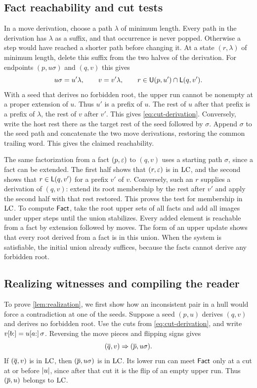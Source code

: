 \subsection{Fact reachability and cut tests}

In a move derivation, choose a path $\lambda$ of minimum length.
Every path in the derivation has $\lambda$ as a suffix, and that
occurrence is never popped. Otherwise a step would have reached a
shorter path before changing it. At a state $(r,\lambda)$ of minimum
length, delete this suffix from the two halves of the derivation.
For endpoints $(p,u\sigma)$ and $(q,v)$ this gives
\[
 u\sigma=u'\lambda,\qquad v=v'\lambda,\qquad
 r\in\mathsf U(p,u')\cap\mathsf L(q,v').
\]
With a seed that derives no forbidden root, the upper run cannot be
nonempty at a proper extension of $u$. Thus $u'$ is a prefix of $u$.
The rest of $u$ after that prefix is a prefix of $\lambda$, the rest
of $v$ after $v'$. This gives \eqref{eq:cut-derivation}. Conversely,
write the host rest there as the target rest of the seed followed by
$\sigma$. Append $\sigma$ to the seed path and concatenate the two
move derivations, restoring the common trailing word. This gives the
claimed reachability.

The same factorization from a fact $(p,\varepsilon)$ to $(q,v)$ uses a starting
path $\sigma$, since a fact can be extended. The first half shows that
$(r,\varepsilon)$ is in $\mathrm{LC}$, and the second shows that
$r\in\mathsf L(q,v')$ for a prefix $v'$ of $v$. Conversely, such an $r$ supplies
a derivation of $(q,v)$: extend its root membership by the rest after
$v'$ and apply the second half with that rest restored. This proves
the test for membership in $\mathrm{LC}$. To compute $\mathsf{Fact}$, take the root
upper sets of all facts and add all images under upper steps until
the union stabilizes. Every added element is reachable from a fact
by extension followed by moves. The form of an upper update shows
that every root derived from a fact is in this union. When the system
is satisfiable, the initial union already suffices, because the facts
cannot derive any forbidden root.

\subsection{Realizing witnesses and compiling the reader}

To prove \cref{lem:realization}, we first show how an inconsistent
pair in a hull would force a contradiction at one of the seeds.
Suppose a seed $(p,u)$ derives $(q,v)$ and derives no forbidden root.
Use the cuts from \eqref{eq:cut-derivation}, and write
$v[b{:}]=u[a{:}]\,\sigma$. Reversing the move pieces and flipping signs
gives
\[
         (\overline{q},v)\Rightarrow(\overline{p},u\sigma).
\]
If $(\overline{q},v)$ is in $\mathrm{LC}$, then $(\overline{p},u\sigma)$ is in $\mathrm{LC}$.
Its lower run can meet $\mathsf{Fact}$ only at a cut at or before $\lvert u\rvert$,
since after that cut it is the flip of an empty upper run. Thus
$(\overline{p},u)$ belongs to $\mathrm{LC}$.

